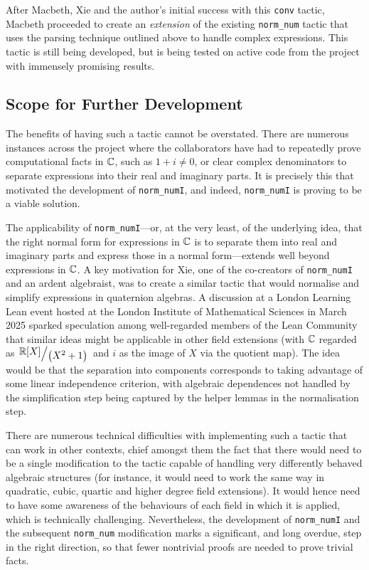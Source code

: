 After Macbeth, Xie and the author's initial success with this \lstinline|conv| tactic, Macbeth proceeded to create an \textit{extension} of the existing \lstinline|norm_num| tactic that uses the parsing technique outlined above to handle complex expressions. This tactic is still being developed, but is being tested on active code from the project with immensely promising results.

\subsection{Scope for Further Development}

The benefits of having such a tactic cannot be overstated. There are numerous instances across the project where the collaborators have had to repeatedly prove computational facts in $\mathbb{C}$, such as $1 + i \neq 0$, or clear complex denominators to separate expressions into their real and imaginary parts. It is precisely this that motivated the development of \lstinline|norm_numI|, and indeed, \lstinline|norm_numI| is proving to be a viable solution.


The applicability of \lstinline|norm_numI|---or, at the very least, of the underlying idea, that the right normal form for expressions in $\mathbb{C}$ is to separate them into real and imaginary parts and express those in a normal form---extends well beyond expressions in $\mathbb{C}$. A key motivation for Xie, one of the co-creators of \lstinline|norm_numI| and an ardent algebraist, was to create a similar tactic that would normalise and simplify expressions in quaternion algebras. A discussion at a London Learning Lean event hosted at the London Institute of Mathematical Sciences in March 2025 sparked speculation among well-regarded members of the Lean Community that similar ideas might be applicable in other field extensions (with $\mathbb{C}$ regarded as $\quotient{\R[X]}{\parenth{X^2 + 1}}$ and $i$ as the image of $X$ via the quotient map). The idea would be that the separation into components corresponds to taking advantage of some linear independence criterion, with algebraic dependences not handled by the simplification step being captured by the helper lemmas in the normalisation step.

There are numerous technical difficulties with implementing such a tactic that can work in other contexts, chief amongst them the fact that there would need to be a single modification to the tactic capable of handling very differently behaved algebraic structures (for instance, it would need to work the same way in quadratic, cubic, quartic and higher degree field extensions). It would hence need to have some awareness of the behaviours of each field in which it is applied, which is technically challenging. Nevertheless, the development of \lstinline|norm_numI| and the subsequent \lstinline|norm_num| modification marks a significant, and long overdue, step in the right direction, so that fewer nontrivial proofs are needed to prove trivial facts.